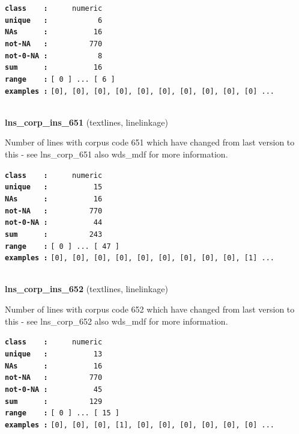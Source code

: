 \documentclass[]{article}
\begin{document}
\textbf{\texttt{class\ \ \ \ :}} \texttt{~~~~~numeric}\\
\textbf{\texttt{unique\ \ \ :}} \texttt{~~~~~~~~~~~6}\\
\textbf{\texttt{NAs\ \ \ \ \ \ :}} \texttt{~~~~~~~~~~16}\\
\textbf{\texttt{not-NA\ \ \ :}} \texttt{~~~~~~~~~770}\\
\textbf{\texttt{not-0-NA\ :}} \texttt{~~~~~~~~~~~8}\\
\textbf{\texttt{sum\ \ \ \ \ \ :}} \texttt{~~~~~~~~~~16}\\
\textbf{\texttt{range\ \ \ \ :}}
\texttt{{[}\ 0\ {]}\ ...\ {[}\ 6\ {]}}\\
\textbf{\texttt{examples\ :}}
\texttt{{[}0{]},\ {[}0{]},\ {[}0{]},\ {[}0{]},\ {[}0{]},\ {[}0{]},\ {[}0{]},\ {[}0{]},\ {[}0{]},\ {[}0{]}\ ...}\\

~

\textbf{lns\_corp\_ins\_651} (textlines, linelinkage)

Number of lines with corpus code 651 which have changed from last
version to this - see lns\_corp\_651 also wds\_mdf for more information.

\textbf{\texttt{class\ \ \ \ :}} \texttt{~~~~~numeric}\\
\textbf{\texttt{unique\ \ \ :}} \texttt{~~~~~~~~~~15}\\
\textbf{\texttt{NAs\ \ \ \ \ \ :}} \texttt{~~~~~~~~~~16}\\
\textbf{\texttt{not-NA\ \ \ :}} \texttt{~~~~~~~~~770}\\
\textbf{\texttt{not-0-NA\ :}} \texttt{~~~~~~~~~~44}\\
\textbf{\texttt{sum\ \ \ \ \ \ :}} \texttt{~~~~~~~~~243}\\
\textbf{\texttt{range\ \ \ \ :}}
\texttt{{[}\ 0\ {]}\ ...\ {[}\ 47\ {]}}\\
\textbf{\texttt{examples\ :}}
\texttt{{[}0{]},\ {[}0{]},\ {[}0{]},\ {[}0{]},\ {[}0{]},\ {[}0{]},\ {[}0{]},\ {[}0{]},\ {[}0{]},\ {[}1{]}\ ...}\\

~

\textbf{lns\_corp\_ins\_652} (textlines, linelinkage)

Number of lines with corpus code 652 which have changed from last
version to this - see lns\_corp\_652 also wds\_mdf for more information.

\textbf{\texttt{class\ \ \ \ :}} \texttt{~~~~~numeric}\\
\textbf{\texttt{unique\ \ \ :}} \texttt{~~~~~~~~~~13}\\
\textbf{\texttt{NAs\ \ \ \ \ \ :}} \texttt{~~~~~~~~~~16}\\
\textbf{\texttt{not-NA\ \ \ :}} \texttt{~~~~~~~~~770}\\
\textbf{\texttt{not-0-NA\ :}} \texttt{~~~~~~~~~~45}\\
\textbf{\texttt{sum\ \ \ \ \ \ :}} \texttt{~~~~~~~~~129}\\
\textbf{\texttt{range\ \ \ \ :}}
\texttt{{[}\ 0\ {]}\ ...\ {[}\ 15\ {]}}\\
\textbf{\texttt{examples\ :}}
\texttt{{[}0{]},\ {[}0{]},\ {[}0{]},\ {[}1{]},\ {[}0{]},\ {[}0{]},\ {[}0{]},\ {[}0{]},\ {[}0{]},\ {[}0{]}\ ...}\\
\end{document}
